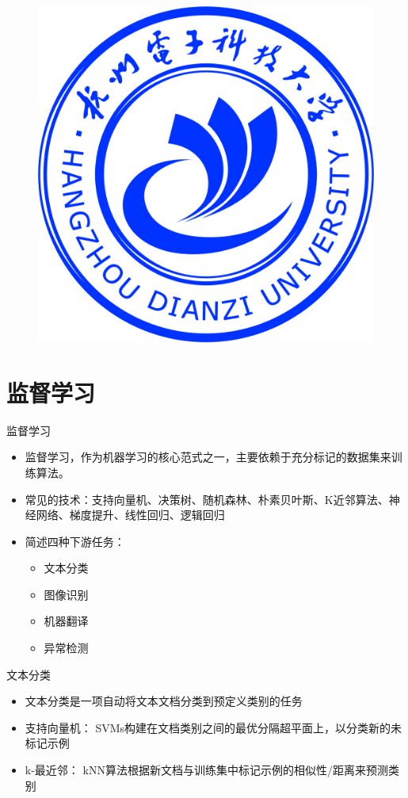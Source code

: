 \documentclass[UTF8]{beamer}
\author{\MyFont{黄锦栋、李奕橦、龙翔、杨欢、赵乐毅}}
\title{\MyFont{无监督学习、半监督学习、监督学习在四种下游任务中的简述}}
\subtitle{机器学习课程作业}
\institute{\MyFont{网络空间安全学院}}
\date{\today}
\newcommand{\MyFont}{\CJKfamily{myfont}}
\begin{document}
\MyFont
\begin{frame}
    \titlepage
    \begin{figure}[htpb]
        \begin{center}
            \includegraphics[width=0.18\linewidth]{img/hdu-logo.jpg} %
        \end{center}
    \end{figure}
\end{frame}

%  

\begin{frame}
    \tableofcontents[sectionstyle=show,subsectionstyle=show/shaded/hide,subsubsectionstyle=show/shaded/hide]
\end{frame}

\section{监督学习}
\begin{frame}{监督学习}
    \begin{itemize}
        \item 监督学习，作为机器学习的核心范式之一，主要依赖于充分标记的数据集来训练算法。
        \item 常见的技术：支持向量机、决策树、随机森林、朴素贝叶斯、K近邻算法、神经网络、梯度提升、线性回归、逻辑回归
        \item 简述四种下游任务：
        \begin{itemize}
            \item 文本分类
            \item 图像识别
            \item 机器翻译
            \item 异常检测
        \end{itemize}
    \end{itemize}
\end{frame}

\begin{frame}{文本分类}
    \small
    \begin{itemize}
        \item 文本分类是一项自动将文本文档分类到预定义类别的任务
        \item 支持向量机： SVMs构建在文档类别之间的最优分隔超平面上，以分类新的未标记示例
        \item k-最近邻： kNN算法根据新文档与训练集中标记示例的相似性/距离来预测类别
    \end{itemize}
\end{frame}
\end{document}
